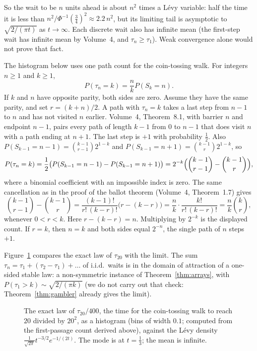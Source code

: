 So the wait to be $n$ units ahead is about $n^2$ times a L\'evy variable: half the time it is less than $n^2/\Phi^{-1}(\frac34)^2\approx2.2\,n^2$, but its limiting tail is asymptotic to $\sqrt{2/(\pi t)}$ as $t\to\infty$. Each discrete wait also has infinite mean (the first-step wait has infinite mean by Volume~4, and $\tau_n\ge\tau_1$). Weak convergence alone would not prove that fact.

The histogram below uses one path count for the coin-tossing walk. For integers $n\ge1$ and $k\ge1$,
\[
P(\tau_n=k)=\frac nk P(S_k=n).
\]
If $k$ and $n$ have opposite parity, both sides are zero. Assume they have the same parity, and set $r=(k+n)/2$. A path with $\tau_n=k$ takes a last step from $n-1$ to $n$ and has not visited $n$ earlier. Volume~4, Theorem~8.1, with barrier $n$ and endpoint $n-1$, pairs every path of length $k-1$ from $0$ to $n-1$ that does visit $n$ with a path ending at $n+1$. The last step is $+1$ with probability $\frac12$. Also $P(S_{k-1}=n-1)=\binom{k-1}{r-1}2^{1-k}$ and $P(S_{k-1}=n+1)=\binom{k-1}{r}2^{1-k}$, so
\[
P(\tau_n=k)=\frac12\bigl(P(S_{k-1}=n-1)-P(S_{k-1}=n+1)\bigr)
=2^{-k}\Bigl(\binom{k-1}{r-1}-\binom{k-1}{r}\Bigr),
\]
where a binomial coefficient with an impossible index is zero. The same cancellation as in the proof of the ballot theorem (Volume~4, Theorem~1.7) gives
\[
\binom{k-1}{r-1}-\binom{k-1}{r}
=\frac{(k-1)!}{r!\,(k-r)!}\bigl(r-(k-r)\bigr)
=\frac{n}{k}\cdot\frac{k!}{r!\,(k-r)!}
=\frac nk\binom{k}{r},
\]
whenever $0<r<k$. Here $r-(k-r)=n$. Multiplying by $2^{-k}$ is the displayed count. If $r=k$, then $n=k$ and both sides equal $2^{-n}$, the single path of $n$ steps $+1$.

Figure~\ref{fig:firstpassage} compares the exact law of $\tau_{20}$ with the limit.
The sum $\tau_n=\tau_1+(\tau_2-\tau_1)+\dots$ of i.i.d.\ waits is in the domain of attraction of a one-sided stable law: a non-symmetric instance of
Theorem~\ref{thm:arrays}, with $P(\tau_1>k)\sim\sqrt{2/(\pi k)}$ (we do not carry out that check: Theorem~\ref{thm:gambler} already gives the limit).

\begin{figure}[ht]
\centering{}
\caption{The exact law of $\tau_{20}/400$, the time for the coin-tossing walk to reach $20$ divided by $20^2$, as a histogram (bins of width $0.1$; computed
from the first-passage count derived above), against the L\'evy density $\frac1{\sqrt{2\pi}}t^{-3/2}e^{-1/(2t)}$. The mode is at $t=\frac13$; the mean is infinite.}
\label{fig:firstpassage}
\end{figure}

